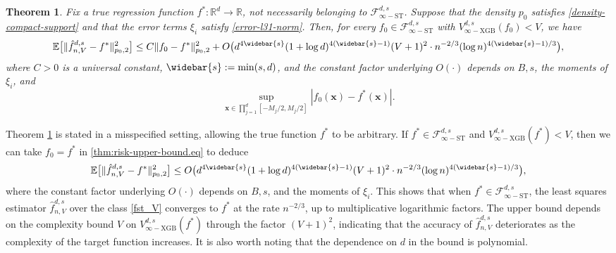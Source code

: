 \documentclass[10pt]{article}
\newtheorem{theorem}{Theorem}
\newcommand{\E}{{\mathbb E}}
\newcommand{\R}{{\mathbb R}}
\newcommand{\fstinf}{{\mathcal{F}^{d, s}_{\infty-\text{ST}}}}
\newcommand{\vinfxgb}{{V^{d, s}_{\infty-\text{XGB}}}}
\newcommand{\lsefstinf}{{\hat{f}^{d, s}_{n, V}}}
\newcommand{\xbf}{{\mathbf{x}}}
\begin{document}
\begin{theorem}\label{thm:risk-upper-bound}
    Fix a true regression function $f^* : \R^d \rightarrow \R$, 
    not necessarily belonging to $\fstinf$. Suppose that the density
    $p_0$ satisfies \eqref{density-compact-support} and that the 
    error terms $\xi_i$ satisfy \eqref{error-l31-norm}. Then, for 
    every $f_0 \in \fstinf$ with $\vinfxgb(f_0) < V$, we have  
    \begin{equation}\label{thm:risk-upper-bound.eq}
        \E \big[\|\lsefstinf - f^*\|_{p_0, 2}^2 \big] 
        \le C \|f_0 - f^*\|_{p_0, 2}^2 + 
        O\big(d^{4\widebar{s}}(1 + \log d)^{4(\widebar{s} - 1)}
        (V + 1)^2 \cdot n^{-2/3} (\log n)^{4(\widebar{s} - 1)/3}\big),
    \end{equation}
    where $C > 0$ is a universal constant, $\widebar{s} := \min(s, d)$, 
    and the constant factor underlying $O(\cdot)$ depends on $B, s$, 
    the moments of $\xi_i$, and 
    \begin{equation*}
        \sup_{\xbf \in \prod_{j = 1}^{d} [-M_j/2, M_j/2]} 
        |f_0(\xbf) - f^*(\xbf)|.
    \end{equation*}
\end{theorem}

Theorem \ref{thm:risk-upper-bound} is stated in a misspecified setting,
allowing the true function $f^*$ to be arbitrary. If $f^* \in
\fstinf$ and $\vinfxgb(f^*) < V$, then we can take $f_0 = f^*$ in
\eqref{thm:risk-upper-bound.eq} to deduce
\begin{equation*}
    \E \big[\|\lsefstinf - f^*\|_{p_0, 2}^2 \big] 
    \le O\big(d^{4\widebar{s}}(1 + \log d)^{4(\widebar{s} - 1)}
    (V + 1)^2 \cdot n^{-2/3} (\log n)^{4(\widebar{s} - 1)/3}\big),
\end{equation*}
where the constant factor underlying $O(\cdot)$ depends on 
$B, s$, and the moments of $\xi_i$. This shows that when $f^* \in
\fstinf$, the least squares estimator $\lsefstinf$ over the class
\eqref{fst_V} converges to $f^*$ at the rate $n^{-2/3}$, up to
multiplicative logarithmic factors.  
The upper bound depends on the complexity bound $V$ on $\vinfxgb(f^*)$ 
through the factor $(V + 1)^2$, indicating that the accuracy of 
$\lsefstinf$ deteriorates as the complexity of the target function 
increases. It is also worth noting that the dependence on $d$ in 
the bound is polynomial.
\end{document}
